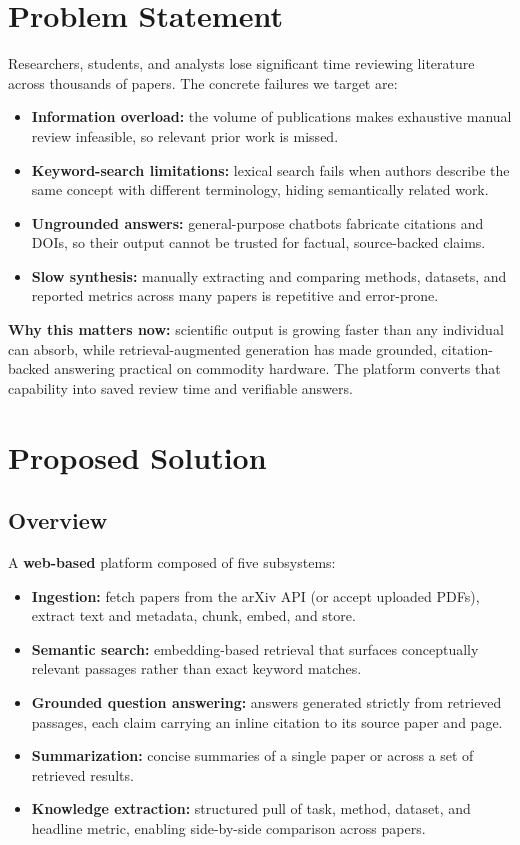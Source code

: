 \documentclass[11pt,a4paper]{article}
\begin{document}
\section{Problem Statement}
Researchers, students, and analysts lose significant time reviewing literature across thousands of papers. The concrete failures we target are:
\begin{itemize}[leftmargin=0.7cm]
    \item \textbf{Information overload:} the volume of publications makes exhaustive manual review infeasible, so relevant prior work is missed.
    \item \textbf{Keyword-search limitations:} lexical search fails when authors describe the same concept with different terminology, hiding semantically related work.
    \item \textbf{Ungrounded answers:} general-purpose chatbots fabricate citations and DOIs, so their output cannot be trusted for factual, source-backed claims.
    \item \textbf{Slow synthesis:} manually extracting and comparing methods, datasets, and reported metrics across many papers is repetitive and error-prone.
\end{itemize}

\textbf{Why this matters now:} scientific output is growing faster than any individual can absorb, while retrieval-augmented generation has made grounded, citation-backed answering practical on commodity hardware. The platform converts that capability into saved review time and verifiable answers.

\section{Proposed Solution}
\subsection{Overview}
A \textbf{web-based} platform composed of five subsystems:
\begin{itemize}[leftmargin=0.7cm]
    \item \textbf{Ingestion:} fetch papers from the arXiv API (or accept uploaded PDFs), extract text and metadata, chunk, embed, and store.
    \item \textbf{Semantic search:} embedding-based retrieval that surfaces conceptually relevant passages rather than exact keyword matches.
    \item \textbf{Grounded question answering:} answers generated strictly from retrieved passages, each claim carrying an inline citation to its source paper and page.
    \item \textbf{Summarization:} concise summaries of a single paper or across a set of retrieved results.
    \item \textbf{Knowledge extraction:} structured pull of task, method, dataset, and headline metric, enabling side-by-side comparison across papers.
\end{itemize}
\end{document}
